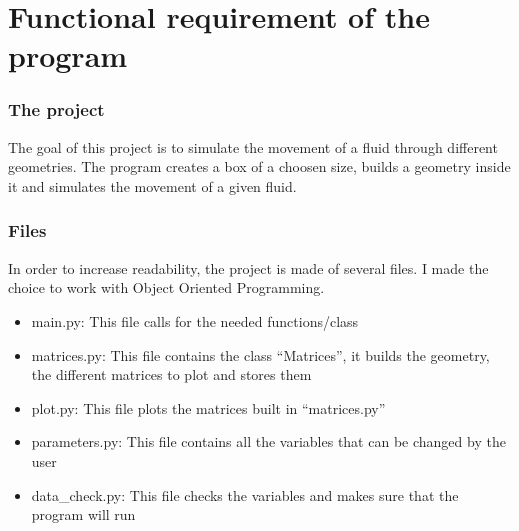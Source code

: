 \part{Functional requirement of the program}
\section{The project}
The goal of this project is to simulate the movement of a fluid through
different geometries. The program creates a box of a choosen size, builds a
geometry inside it and simulates the movement of a given fluid.
\section{Files}
In order to increase readability, the project is made of several files.
I made the choice to work with Object Oriented Programming.
\begin{itemize}
      \item main.py: This file calls for the needed functions/class
      \item matrices.py: This file contains the class ``Matrices'', it builds
            the geometry, the different matrices to plot and stores them
      \item plot.py: This file plots the matrices built in ``matrices.py''
      \item parameters.py: This file contains all the variables that can be 
          changed by the user
      \item data\_check.py: This file checks the variables and makes sure that
          the program will run
\end{itemize}

